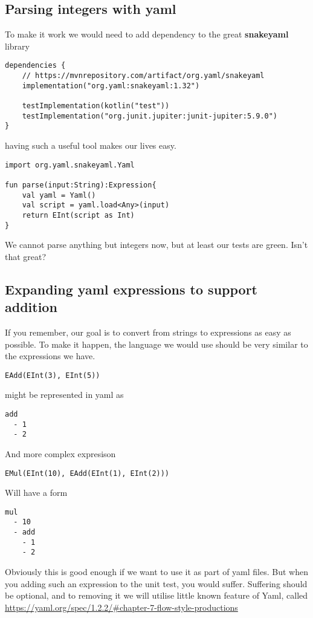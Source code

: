 \documentclass[11pt]{article}
\begin{document}
\subsection{Parsing integers with yaml}
\label{sec:orgb90d986}
To make it work we would need to add dependency to the great \textbf{snakeyaml} library
\begin{verbatim}
dependencies {
    // https://mvnrepository.com/artifact/org.yaml/snakeyaml
    implementation("org.yaml:snakeyaml:1.32")

    testImplementation(kotlin("test"))
    testImplementation("org.junit.jupiter:junit-jupiter:5.9.0")
}
\end{verbatim}

having such a useful tool makes our lives easy.

\begin{verbatim}
import org.yaml.snakeyaml.Yaml

fun parse(input:String):Expression{
    val yaml = Yaml()
    val script = yaml.load<Any>(input)
    return EInt(script as Int)
}
\end{verbatim}

We cannot parse anything but integers now, but at least our tests are green. Isn't that great?
\subsection{Expanding yaml expressions to support addition}
\label{sec:org9354732}
If you remember, our goal is to convert from strings to expressions as easy as possible.
To make it happen, the language we would use should be very similar to the expressions we have.

\begin{verbatim}
EAdd(EInt(3), EInt(5))
\end{verbatim}

might be represented in yaml as
\begin{verbatim}
add
  - 1
  - 2
\end{verbatim}

And more complex expresison
\begin{verbatim}
EMul(EInt(10), EAdd(EInt(1), EInt(2)))
\end{verbatim}
Will have a form
\begin{verbatim}
mul
  - 10
  - add
    - 1
    - 2
\end{verbatim}

Obviously this is good enough if we want to use it as part of yaml files.
But when you adding such an expression to the unit test, you would suffer.
Suffering should be optional, and to removing it we will utilise little known feature of Yaml, called \url{https://yaml.org/spec/1.2.2/\#chapter-7-flow-style-productions}
\end{document}
